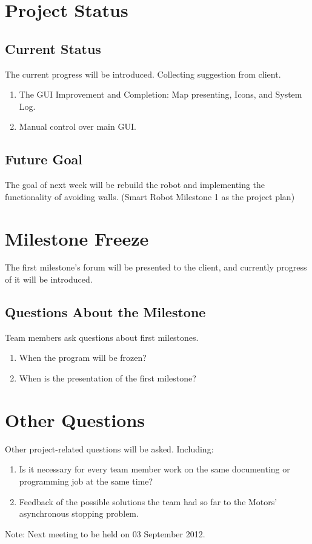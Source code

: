 \documentclass[11pt, a4paper]{article}
\begin{document}
\section{Project Status}

\subsection{Current Status}
The current progress will be introduced. Collecting suggestion from client.
\begin{enumerate}
	\item The GUI Improvement and Completion: Map presenting, Icons, and System Log.
	\item Manual control over main GUI.
\end{enumerate}
\subsection{Future Goal}
The goal of next week will be rebuild the robot and implementing the functionality of avoiding walls. (Smart Robot Milestone 1 as the project plan)

\section{Milestone Freeze}
The first milestone's forum will be presented to the client, and currently progress of it will be introduced.
\subsection{Questions About the Milestone}
Team members ask questions about first milestones. 
\begin{enumerate}
	\item  When the program will be frozen?
	\item  When is the presentation of the first milestone?
\end{enumerate}

\section{Other Questions}
Other project-related questions will be asked. Including: 
\begin{enumerate}
	\item  Is it necessary for every team member work on the same documenting or programming job at the same time?
	\item  Feedback of the possible solutions the team had so far to the Motors' asynchronous stopping problem.
\end{enumerate}



\vspace*{10pt}
\noindent Note: Next meeting to be held on 03 September 2012.
\end{document}
